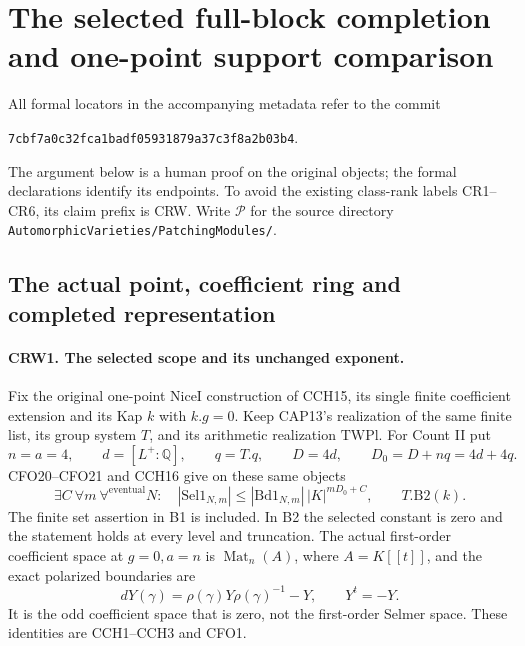 \section{The selected full-block completion and one-point support comparison}
\label{sec:count-raw-v038}


All formal locators in the accompanying metadata refer to the commit
\par\smallskip\noindent\texttt{7cbf7a0c32fca1badf05931879a37c3f8a2b03b4}.\par\smallskip
The argument below is a human proof on the original objects; the
formal declarations identify its endpoints.  To avoid the existing
class-rank labels CR1--CR6, its claim prefix is CRW.
Write $\mathcal P$ for the source directory
\texttt{AutomorphicVarieties/PatchingModules/}.

\subsection{The actual point, coefficient ring and completed representation}

\paragraph{CRW1. The selected scope and its unchanged exponent.}
\label{claim:CRW1}
Fix the original one-point NiceI construction of CCH15, its single
finite coefficient extension and its Kap $k$ with $k.g=0$.
Keep CAP13's realization of the same finite list, its group system
$T$, and its arithmetic realization $\mathrm{TWPl}$.
For Count II put
\[
 n=a=4,\qquad d=[L^+:\mathbb Q],\qquad q=T.q,
 \qquad D=4d,\qquad D_0=D+nq=4d+4q.                 \tag{CRW.1}
\]
CFO20--CFO21 and CCH16 give on these same objects
\[
 \exists C\ \forall m\ \forall^{\mathrm{eventual}}N:
 \quad |\mathrm{Sel1}_{N,m}|
 \leq |\mathrm{Bd1}_{N,m}|\,|K|^{mD_0+C},
 \qquad T.\mathrm{B2}(k).                           \tag{CRW.2}
\]
The finite set assertion in B1 is included.  In B2 the selected
constant is zero and the statement holds at every level and
truncation.  The actual first-order coefficient space at $g=0,a=n$
is $\operatorname{Mat}_n(A)$, where $A=K[[t]]$, and the exact
polarized boundaries are
\[
 dY(\gamma)=\rho(\gamma)Y\rho(\gamma)^{-1}-Y,
 \qquad Y^t=-Y.                                   \tag{CRW.3}
\]
It is the odd coefficient space that is zero, not the first-order
Selmer space.  These identities are CCH1--CCH3 and CFO1.

